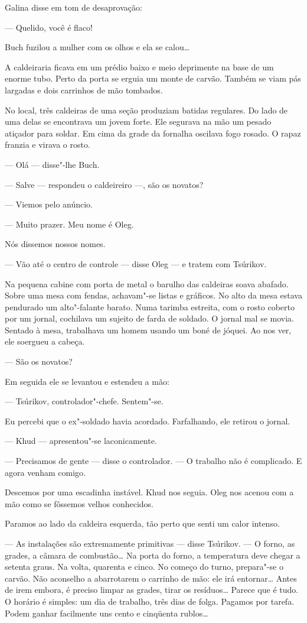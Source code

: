 Galina disse em tom de desaprovação:

--- Quelido, você é flaco!

Buch fuzilou a mulher com os olhos e ela se calou\ldots{}

A caldeiraria ficava em um prédio baixo e meio deprimente na base de um
enorme tubo. Perto da porta se erguia um monte de carvão. Também se viam
pás largadas e dois carrinhos de mão tombados.

No local, três caldeiras de uma seção produziam batidas regulares. Do
lado de uma delas se encontrava um jovem forte. Ele segurava na mão um
pesado atiçador para soldar. Em cima da grade da fornalha oscilava fogo
rosado. O rapaz franzia e virava o rosto.

--- Olá --- disse"-lhe Buch.

--- Salve --- respondeu o caldeireiro ---, são os novatos?

--- Viemos pelo anúncio.

--- Muito prazer. Meu nome é Oleg.

Nós dissemos nossos nomes.

--- Vão até o centro de controle --- disse Oleg --- e tratem com
Tsúrikov.

Na pequena cabine com porta de metal o barulho das caldeiras soava
abafado. Sobre uma mesa com fendas, achavam"-se listas e gráficos. No
alto da mesa estava pendurado um alto"-falante barato. Numa tarimba
estreita, com o rosto coberto por um jornal, cochilava um sujeito de
farda de soldado. O jornal mal se movia. Sentado à mesa, trabalhava um
homem usando um boné de jóquei. Ao nos ver, ele soergueu a cabeça.

--- São os novatos?

Em seguida ele se levantou e estendeu a mão:

--- Tsúrikov, controlador"-chefe. Sentem"-se.

Eu percebi que o ex"-soldado havia acordado. Farfalhando, ele retirou o
jornal.

--- Khud --- apresentou"-se laconicamente.

--- Precisamos de gente --- disse o controlador. --- O trabalho não é
complicado. E agora venham comigo.

Descemos por uma escadinha instável. Khud nos seguia. Oleg nos acenou
com a mão como se fôssemos velhos conhecidos.

Paramos ao lado da caldeira esquerda, tão perto que senti um calor
intenso.

--- As instalações são extremamente primitivas --- disse Tsúrikov. --- O
forno, as grades, a câmara de combustão\ldots{} Na porta do forno, a
temperatura deve chegar a setenta graus. Na volta, quarenta e cinco. No
começo do turno, prepara"-se o carvão. Não aconselho a abarrotarem o
carrinho de mão: ele irá entornar\ldots{} Antes de irem embora, é preciso
limpar as grades, tirar os resíduos\ldots{} Parece que é tudo. O horário é
simples: um dia de trabalho, três dias de folga. Pagamos por tarefa.
Podem ganhar facilmente uns cento e cinqüenta rublos\ldots{} %

